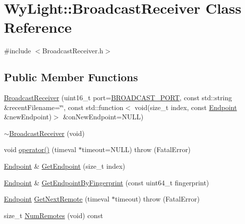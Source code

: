 \hypertarget{class_wy_light_1_1_broadcast_receiver}{\section{Wy\-Light\-:\-:Broadcast\-Receiver Class Reference}
\label{class_wy_light_1_1_broadcast_receiver}
}


{\ttfamily \#include $<$Broadcast\-Receiver.\-h$>$}

\subsection*{Public Member Functions}
\begin{DoxyCompactItemize}
\item 
\hyperlink{class_wy_light_1_1_broadcast_receiver_ac03335f0824e0de7d0dd87d5187aafa3}{Broadcast\-Receiver} (uint16\-\_\-t port=\hyperlink{class_wy_light_1_1_broadcast_receiver_a7cdb8d26a95a50b32317bb8332668f9f}{B\-R\-O\-A\-D\-C\-A\-S\-T\-\_\-\-P\-O\-R\-T}, const std\-::string \&recent\-Filename=\char`\"{}\char`\"{}, const std\-::function$<$ void(size\-\_\-t index, const \hyperlink{class_wy_light_1_1_endpoint}{Endpoint} \&new\-Endpoint)$>$ \&on\-New\-Endpoint=N\-U\-L\-L)
\item 
\hyperlink{class_wy_light_1_1_broadcast_receiver_a027160f232b143e429d7ff61834c9d04}{$\sim$\-Broadcast\-Receiver} (void)
\item 
void \hyperlink{class_wy_light_1_1_broadcast_receiver_a97759f96b2fd9f2e999cc141a81e17b8}{operator()} (timeval $\ast$timeout=N\-U\-L\-L)  throw (\-Fatal\-Error)
\item 
\hyperlink{class_wy_light_1_1_endpoint}{Endpoint} \& \hyperlink{class_wy_light_1_1_broadcast_receiver_ab4950ea01d61e47ae91bb085b0135919}{Get\-Endpoint} (size\-\_\-t index)
\item 
\hyperlink{class_wy_light_1_1_endpoint}{Endpoint} \& \hyperlink{class_wy_light_1_1_broadcast_receiver_a57116a61823954a3a86e11d86e2975c7}{Get\-Endpoint\-By\-Fingerprint} (const uint64\-\_\-t fingerprint)
\item 
\hyperlink{class_wy_light_1_1_endpoint}{Endpoint} \hyperlink{class_wy_light_1_1_broadcast_receiver_a1ed47e38dbc6475905afc528d3bc5420}{Get\-Next\-Remote} (timeval $\ast$timeout)  throw (\-Fatal\-Error)
\item 
size\-\_\-t \hyperlink{class_wy_light_1_1_broadcast_receiver_ab8100fdc85265308689ce34147f106bb}{Num\-Remotes} (void) const 
\item 

\end{DoxyCompactItemize}
